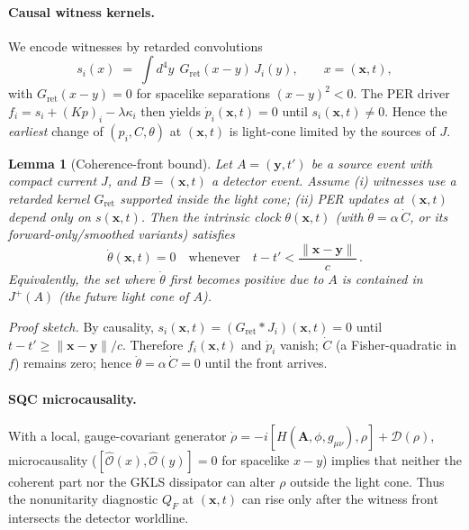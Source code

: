 \documentclass[11pt]{article}
\newtheorem{lemma}{Lemma}
\begin{document}
\paragraph{Causal witness kernels.}
We encode witnesses by retarded convolutions
\begin{equation}
s_i(x)\;=\;\int d^4y\;\,G_{\mathrm{ret}}(x-y)\,J_i(y),\qquad x=(\mathbf x,t),
\end{equation}
with $G_{\mathrm{ret}}(x-y)=0$ for spacelike separations $(x-y)^2<0$.
The PER driver $f_i=s_i+(Kp)_i-\lambda\kappa_i$ then yields
$\dot p_i(\mathbf x,t)=0$ until $s_i(\mathbf x,t)\neq 0$.
Hence the \emph{earliest} change of $(p_i,C,\theta)$ at $(\mathbf x,t)$ is light-cone limited by the sources of $J$.

\begin{lemma}[Coherence-front bound]
Let $A=(\mathbf y,t')$ be a source event with compact current $J$, and $B=(\mathbf x,t)$ a detector event.
Assume (i) witnesses use a retarded kernel $G_{\mathrm{ret}}$ supported inside the light cone; (ii) PER updates at $(\mathbf x,t)$ depend only on $s(\mathbf x,t)$.
Then the intrinsic clock $\theta(\mathbf x,t)$ (with $\dot\theta=\alpha\,\dot C$, or its forward-only/smoothed variants) satisfies
\begin{equation}
\dot\theta(\mathbf x,t)=0\quad\text{whenever}\quad t-t' < \frac{\|\mathbf x-\mathbf y\|}{c}\,.
\end{equation}
Equivalently, the set where $\dot\theta$ first becomes positive due to $A$ is contained in $J^+(A)$ (the future light cone of $A$).
\end{lemma}

\noindent\emph{Proof sketch.}
By causality, $s_i(\mathbf x,t)=(G_{\mathrm{ret}}*J_i)(\mathbf x,t)=0$ until $t-t'\ge \|\mathbf x-\mathbf y\|/c$.
Therefore $f_i(\mathbf x,t)$ and $\dot p_i$ vanish; $\dot C$ (a Fisher-quadratic in $f$) remains zero; hence $\dot\theta=\alpha\,\dot C=0$ until the front arrives.

\paragraph{SQC microcausality.}
With a local, gauge-covariant generator $\dot\rho=-i[H(\mathbf A,\phi,g_{\mu\nu}),\rho]+\mathcal D(\rho)$, microcausality ($[\hat{\mathcal O}(x),\hat{\mathcal O}(y)]=0$ for spacelike $x-y$) implies that neither the coherent part nor the GKLS dissipator can alter $\rho$ outside the light cone.
Thus the nonunitarity diagnostic $Q_F$ at $(\mathbf x,t)$ can rise only after the witness front intersects the detector worldline.
\end{document}
